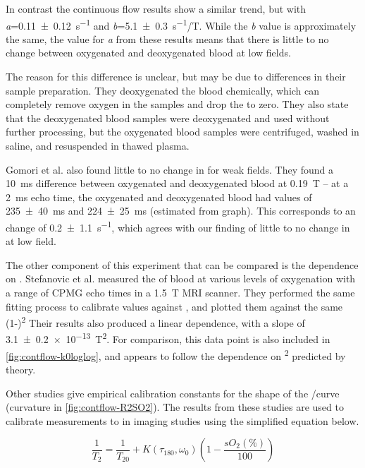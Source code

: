 In contrast the continuous flow results show a similar trend, but with \textit{a}=\SI{0.11\pm0.12}{s^{-1}} and \textit{b}=\SI{5.1\pm0.3}{s^{-1}/T}.
While the \textit{b} value is approximately the same, the value for \textit{a} from these results means that there is little to no change between oxygenated and deoxygenated blood at low fields.

The reason for this difference is unclear, but may be due to differences in their sample preparation.
They deoxygenated the blood chemically, which can completely remove oxygen in the samples and drop the \SOtwo to zero.
They also state that the deoxygenated blood samples were deoxygenated and used without further processing, but the oxygenated blood samples were centrifuged, washed in saline, and resuspended in thawed plasma.

Gomori et al. also found little to no change  in \Ttwo for weak \Bzero fields.
They found a \SI{10}{ms} \Ttwo difference between oxygenated and deoxygenated blood at \SI{0.19}{T} \cite{GomoriNMRRelaxationTimes1987} --
at a \SI{2}{ms} echo time, the oxygenated and deoxygenated blood had \Ttwo values of \SI{235\pm40}{ms} and \SI{224\pm25}{ms} (estimated from graph).
This corresponds to an \Rtwo change of \SI{0.2\pm1.1}{s^{-1}}, which agrees with our finding of little to no change in \Rtwo at low field.

The other component of this experiment that can be compared is the dependence on \SOtwo.
Stefanovic et al. measured the \Ttwo of blood at various levels of oxygenation with a range of CPMG echo times in a \SI{1.5}{T} MRI scanner\cite{StefanovicHumanwholebloodrelaxometry2004}.
They performed the same \Kzero fitting process to calibrate \Kzero values against \SOtwo, and plotted them against the same (1-\SOtwo)\textsuperscript{2}
Their results also produced a linear dependence, with a slope of \SI{3.1\pm0.2 e-13}{T^2}.
For comparison, this data point is also included in \autoref{fig:contflow-k0loglog}, and appears to follow the dependence on \Bzero\textsuperscript{2} predicted by theory.

Other studies give empirical calibration constants for the shape of the \Rtwo/\SOtwo curve (curvature in \autoref{fig:contflow-R2SO2}).
The results from these studies are used to calibrate \Ttwo measurements to \SOtwo in imaging studies using the simplified equation below.

\begin{equation}
\frac{1}{T_2} = \frac{1}{T_{20}} + K\left(\tau_{180},\omega_0\right)\left(1 - \frac{sO_2(\%)}{100}\right)
\label{eq:quadmodel}
\end{equation}

